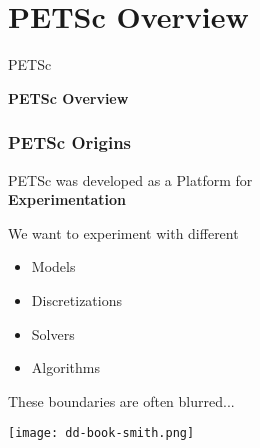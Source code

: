 

\section{PETSc Overview}
\begin{frame}{PETSc}
   \begin{center} \Large \textbf{PETSc Overview} \end{center}
\end{frame}

\begin{frame}[fragile]
\frametitle{PETSc Origins}
 
 \begin{center} \LARGE
  PETSc was developed as a Platform for \\[0.2em] \textbf{\color{ddviolet} Experimentation}
 \end{center}

 \vspace{1cm}
 \begin{block}{We want to experiment with different}
 \begin{itemize}
  \item Models
  \item Discretizations
  \item Solvers
  \item Algorithms
 \end{itemize}
 \end{block}

 \begin{block}{These boundaries are often blurred...}
 \end{block}

 \begin{flushright}
  \vspace*{-5cm}
  \texttt{[image: dd-book-smith.png]}
 \end{flushright}

\end{frame}

